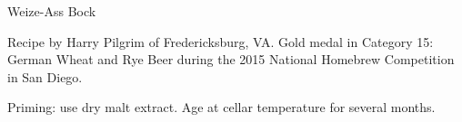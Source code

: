\begin{recipe}{Weize-Ass Bock}

\begin{aboutblock}
Recipe by Harry Pilgrim of Fredericksburg, VA. Gold medal in Category 15: German
Wheat and Rye Beer during the 2015 National Homebrew Competition in San Diego.
\sourceaha
\end{aboutblock}


\begin{methodandtiming}

\begin{mashsteps}
\end{mashsteps}

\begin{fermentationsteps}
\end{fermentationsteps}

\begin{directions}
Priming: use dry malt extract. Age at cellar temperature for several months.
\end{directions}

\end{methodandtiming}

\recipebreak

\begin{ingredientsblock}

\begin{malts}
\end{malts}

\begin{hops}
\end{hops}


\end{ingredientsblock}

\end{recipe}

